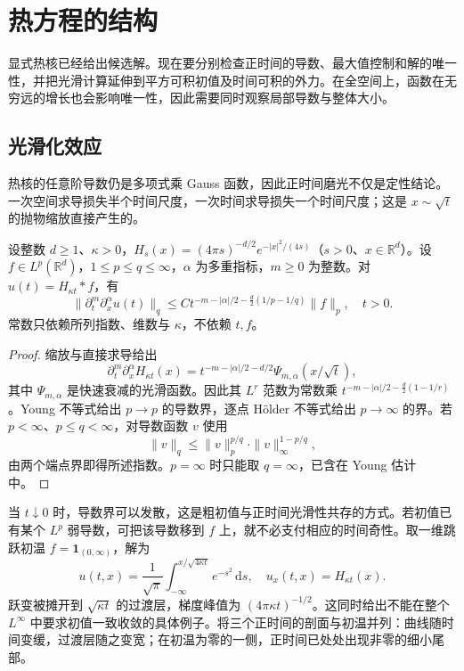 \section{热方程的结构}
\label{b2:sec:1203}

显式热核已经给出候选解。现在要分别检查正时间的导数、最大值控制和解的唯一性，并把光滑计算延伸到平方可积初值及时间可积的外力。在全空间上，函数在无穷远的增长也会影响唯一性，因此需要同时观察局部导数与整体大小。

\subsection{光滑化效应}
\label{b2:subsec:120301}

热核的任意阶导数仍是多项式乘 Gauss 函数，因此正时间磨光不仅是定性结论。一次空间求导损失半个时间尺度，一次时间求导损失一个时间尺度；这是 \(x\sim\sqrt t\) 的抛物缩放直接产生的。

\begin{theorem}[热流的导数估计]\label{b2:thm:12-smoothing}
设整数 \(d\geq1\)、\(\kappa>0\)，\(H_s(x)=(4\pi s)^{-d/2}e^{-|x|^2/(4s)}\)（\(s>0\)、\(x\in\mathbb R^d\)）。设 \(f\in L^p(\mathbb R^d)\)，\(1\leq p\leq q\leq\infty\)，\(\alpha\) 为多重指标，\(m\geq0\) 为整数。对 \(u(t)=H_{\kappa t}*f\)，有
\begin{equation}\label{b2:eq:12-smoothing}
 \|\partial_t^m\partial_x^\alpha u(t)\|_q
 \leq C t^{-m-|\alpha|/2-\frac d2(1/p-1/q)}\|f\|_p,
 \quad t>0.
\end{equation}
常数只依赖所列指数、维数与 \(\kappa\)，不依赖 \(t,f\)。
\end{theorem}
\begin{proof}
缩放与直接求导给出
\[
 \partial_t^m\partial_x^\alpha H_{\kappa t}(x)
 =t^{-m-|\alpha|/2-d/2}\Psi_{m,\alpha}(x/\sqrt t),
\]
其中 \(\Psi_{m,\alpha}\) 是快速衰减的光滑函数。因此其 \(L^r\) 范数为常数乘 \(t^{-m-|\alpha|/2-\frac d2(1-1/r)}\)。Young 不等式给出 \(p\to p\) 的导数界，逐点 Hölder 不等式给出 \(p\to\infty\) 的界。若 \(p<\infty\)、\(p\leq q<\infty\)，对导数函数 \(v\) 使用
\[
 \|v\|_q\leq\|v\|_p^{p/q}\cdot\|v\|_\infty^{1-p/q},
\]
由两个端点界即得所述指数。\(p=\infty\) 时只能取 \(q=\infty\)，已含在 Young 估计中。
\end{proof}

当 \(t\downarrow0\) 时，导数界可以发散，这是粗初值与正时间光滑性共存的方式。若初值已有某个 \(L^p\) 弱导数，可把该导数移到 \(f\) 上，就不必支付相应的时间奇性。取一维跳跃初温 \(f=\mathbf1_{(0,\infty)}\)，解为
\[
 u(t,x)=\dfrac1{\sqrt\pi}\int_{-\infty}^{x/\sqrt{4\kappa t}}e^{-s^2}\,\mathrm{d}s,
 \quad u_x(t,x)=H_{\kappa t}(x).
\]
跃变被摊开到 \(\sqrt{\kappa t}\) 的过渡层，梯度峰值为 \((4\pi\kappa t)^{-1/2}\)。这同时给出不能在整个 \(L^\infty\) 中要求初值一致收敛的具体例子。将三个正时间的剖面与初温并列：曲线随时间变缓，过渡层随之变宽；在初温为零的一侧，正时间已处处出现非零的细小尾部。


